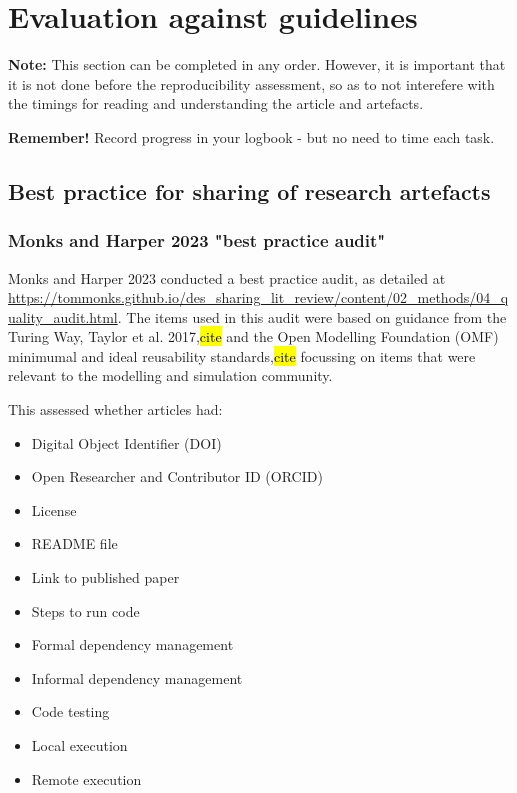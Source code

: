 \section{Evaluation against guidelines}

\textbf{Note:} This section can be completed in any order. However, it is important that it is not done before the reproducibility assessment, so as to not interefere with the timings for reading and understanding the article and artefacts.

\textbf{Remember!} Record progress in your logbook - but no need to time each task.

\vspace{0.5cm}
\subsection{Best practice for sharing of research artefacts}

\subsubsection{Monks and Harper 2023 "best practice audit"}

Monks and Harper 2023\autocite{monks_computer_2023} conducted a best practice audit, as detailed at \url{https://tommonks.github.io/des_sharing_lit_review/content/02_methods/04_quality_audit.html}. The items used in this audit were based on guidance from the Turing Way,\autocite{the_turing_way_community_turing_2022} Taylor et al. 2017,\hl{cite} and the Open Modelling Foundation (OMF) minimumal and ideal reusability standards,\hl{cite} focussing on items that were relevant to the modelling and simulation community.

This assessed whether articles had:
\begin{itemize}
    \item Digital Object Identifier (DOI)
    \item Open Researcher and Contributor ID (ORCID)
    \item License
    \item README file
    \item Link to published paper
    \item Steps to run code
    \item Formal dependency management
    \item Informal dependency management
    \item Code testing
    \item Local execution
    \item Remote execution
\end{itemize}

